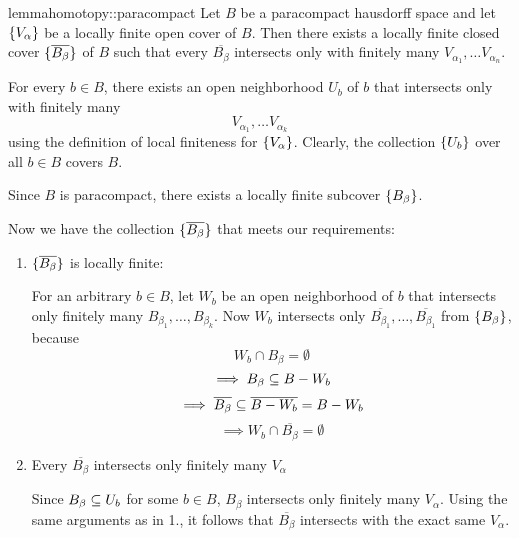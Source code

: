 \begin{mystatement}{lemma}{homotopy::paracompact}
    Let $B$ be a paracompact hausdorff space and let $\{V_\alpha\}$
    be a locally finite open cover of $B$.
    Then there exists a locally finite closed cover $\{\overline{B_\beta}\}$ of $B$
    such that every $\overline{B_\beta}$ intersects only with
    finitely many $V_{\alpha_1}, \dots V_{\alpha_n}$.
\end{mystatement}

\begin{myproof}
    For every $b \in B$, there exists an open neighborhood $U_b$ of $b$ that intersects only with finitely many
    \[ V_{\alpha_1}, \dots V_{\alpha_k} \]
    using the definition of local finiteness for $\{V_\alpha\}$.
    Clearly, the collection $\{U_b\}$ over all $b \in B$ covers $B$.

    Since $B$ is paracompact, there exists a locally finite subcover $\{B_\beta\}$.

    Now we have the collection $\{\overline{B_\beta}\}$ that meets our requirements:
    \begin{enumerate}
        \item $\{\overline{B_\beta}\}$ is locally finite:
        
        For an arbitrary $b \in B$, let $W_b$
        be an open neighborhood of $b$ that intersects only finitely many $B_{\beta_1}, \dots, B_{\beta_k}$.
        Now $W_b$ intersects only $\overline{B_{\beta_1}}, \dots, \overline{B_{\beta_1}}$ from $\{B_\beta\}$, because
        \[ W_b \cap B_\beta = \emptyset \]
        \[ \implies B_\beta \subseteq{} B - W_b \]
        \[ \implies \overline{B_\beta} \subseteq{} \overline{B - W_b} = B - W_b \]
        \[ \implies W_b \cap \overline{B_\beta} = \emptyset \]

        \item Every $\overline{B_\beta}$ intersects only finitely many $V_\alpha$
        
        Since $B_\beta \subseteq{} U_b$ for some $b \in B$, $B_\beta$ intersects only finitely many $V_\alpha$.
        Using the same arguments as in 1., it follows that $\overline{B_\beta}$ intersects with the exact same $V_\alpha$.
    \end{enumerate}
\end{myproof}